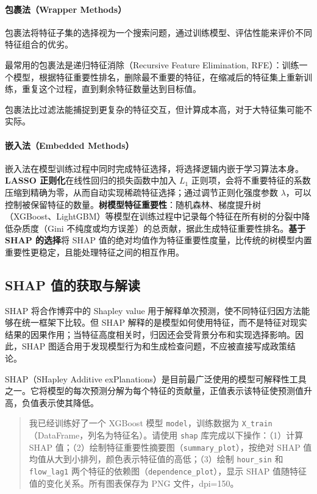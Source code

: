 \paragraph{包裹法（Wrapper Methods）}

包裹法将特征子集的选择视为一个搜索问题，通过训练模型、评估性能来评价不同特征组合的优劣。

最常用的包裹法是递归特征消除（Recursive Feature Elimination, RFE）：训练一个模型，根据特征重要性排名，删除最不重要的特征，在缩减后的特征集上重新训练，重复这个过程，直到剩余特征数量达到目标值。

包裹法比过滤法能捕捉到更复杂的特征交互，但计算成本高，对于大特征集可能不实际。

\paragraph{嵌入法（Embedded Methods）}

嵌入法在模型训练过程中同时完成特征选择，将选择逻辑内嵌于学习算法本身。\textbf{LASSO 正则化}在线性回归的损失函数中加入 $L_1$ 正则项，会将不重要特征的系数压缩到精确为零，从而自动实现稀疏特征选择；通过调节正则化强度参数 $\lambda$，可以控制被保留特征的数量。\textbf{树模型特征重要性}：随机森林、梯度提升树（XGBoost、LightGBM）等模型在训练过程中记录每个特征在所有树的分裂中降低杂质度（Gini 不纯度或均方误差）的总贡献，据此生成特征重要性排名。\textbf{基于 SHAP 的选择}将 SHAP 值的绝对均值作为特征重要性度量，比传统的树模型内置重要性更稳定，且能处理特征之间的相互作用。

\subsection{SHAP 值的获取与解读}

SHAP 将合作博弈中的 Shapley value 用于解释单次预测，使不同特征归因方法能够在统一框架下比较\cite{lundberg2017unified}。但 SHAP 解释的是模型如何使用特征，而不是特征对现实结果的因果作用；当特征高度相关时，归因还会受背景分布和实现选择影响。因此，SHAP 图适合用于发现模型行为和生成检查问题，不应被直接写成政策结论。

SHAP（SHapley Additive exPlanations）是目前最广泛使用的模型可解释性工具之一。它将模型的每次预测分解为每个特征的贡献量，正值表示该特征使预测值升高，负值表示使其降低。

\begin{quote}
我已经训练好了一个 XGBoost 模型 \texttt{model}，训练数据为 \texttt{X\_train}（DataFrame，列名为特征名）。请使用 \texttt{shap} 库完成以下操作：（1）计算 SHAP 值；（2）绘制特征重要性摘要图（\texttt{summary\_plot}），按绝对 SHAP 值均值从大到小排列，颜色表示特征值的高低；（3）绘制 \texttt{hour\_sin} 和 \texttt{flow\_lag1} 两个特征的依赖图（\texttt{dependence\_plot}），显示 SHAP 值随特征值的变化关系。所有图表保存为 PNG 文件，dpi=150。
\end{quote}

